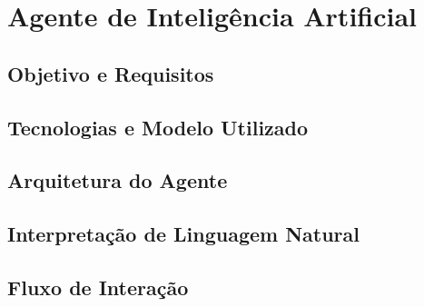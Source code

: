
\chapter{Agente de Inteligência Artificial}
\label{chap:agente-ia}


\section{Objetivo e Requisitos}
\label{sec:objetivo-agente-ia}


\section{Tecnologias e Modelo Utilizado}
\label{sec:tecnologias-agente-ia}


\section{Arquitetura do Agente}
\label{sec:arquitetura-agente-ia}


\section{Interpretação de Linguagem Natural}
\label{sec:interpretacao-linguagem-natural}


\section{Fluxo de Interação}
\label{sec:fluxo-interacao-agente}

